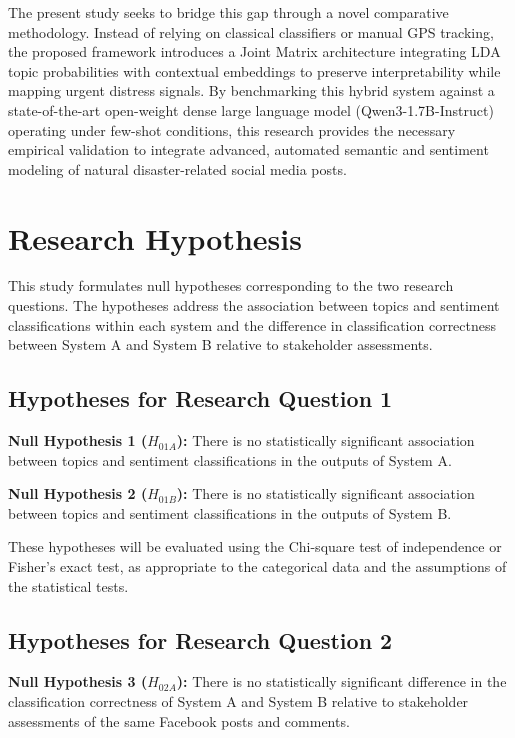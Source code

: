 The present study seeks to bridge this gap through a novel comparative
methodology. Instead of relying on classical classifiers or manual GPS
tracking, the proposed framework introduces a Joint Matrix architecture
integrating LDA topic probabilities with \xlmr{} contextual embeddings to
preserve interpretability while mapping urgent distress signals. By benchmarking
this hybrid system against a state-of-the-art open-weight dense large language
model (Qwen3-1.7B-Instruct) operating under few-shot conditions, this research
provides the necessary empirical validation to integrate advanced, automated
semantic and sentiment modeling of natural disaster-related social media posts.

\section*{Research Hypothesis}
This study formulates null hypotheses corresponding to the two research questions. The hypotheses address the association between topics and sentiment classifications within each system and the difference in classification correctness between System A and System B relative to stakeholder assessments.

\subsection*{Hypotheses for Research Question 1}

\noindent \textbf{Null Hypothesis 1 ($H_{01A}$):} There is no statistically significant association between topics and sentiment classifications in the outputs of System A.


\noindent \textbf{Null Hypothesis 2 ($H_{01B}$):} There is no statistically significant association between topics and sentiment classifications in the outputs of System B.

\noindent These hypotheses will be evaluated using the Chi-square test of independence or Fisher's exact test, as appropriate to the categorical data and the assumptions of the statistical tests.

\subsection*{Hypotheses for Research Question 2}

\noindent \textbf{Null Hypothesis 3 ($H_{02A}$):} There is no statistically significant difference in the classification correctness of System A and System B relative to stakeholder assessments of the same Facebook posts and comments.

